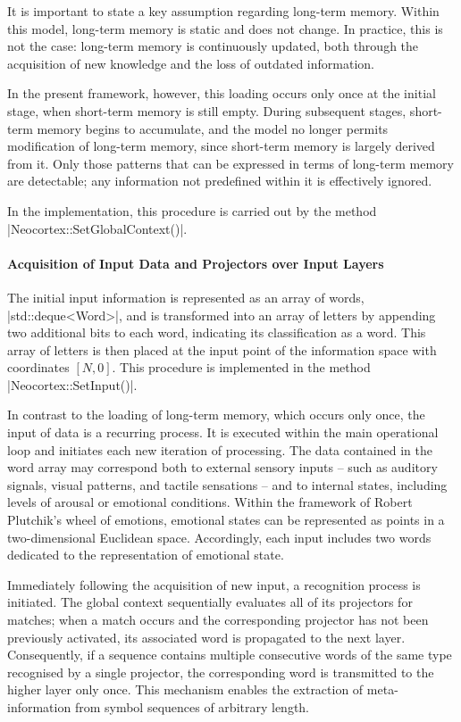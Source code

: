 \documentclass[12pt, a4paper]{article}
\begin{document}
It is important to state a key assumption regarding long-term memory. Within this 
model, long-term memory is static and does not change. In practice, this is not 
the case: long-term memory is continuously updated, both through the acquisition of new 
knowledge and the loss of outdated information.

In the present framework, however, this loading occurs only once at the initial stage, 
when short-term memory is still empty. During subsequent stages, short-term memory 
begins to accumulate, and the model no longer permits modification of long-term memory, 
since short-term memory is largely derived from it. Only those patterns that can be 
expressed in terms of long-term memory are detectable; any information not predefined 
within it is effectively ignored.

In the implementation, this procedure is carried out by the method 
|Neocortex::SetGlobalContext()|.

\paragraph{Acquisition of Input Data and Projectors over Input Layers}

The initial input information is represented as an array of words, 
|std::deque<Word>|, and is transformed into an array of letters by appending two 
additional bits to each word, indicating its classification as a word. This array of 
letters is then placed at the input point of the information space with coordinates 
$[N,0]$. This procedure is implemented in the method |Neocortex::SetInput()|.

In contrast to the loading of long-term memory, which occurs only once, the input 
of data is a recurring process. It is executed within the main operational loop 
and initiates each new iteration of processing. The data contained in the word array 
may correspond both to external sensory inputs -- such as auditory signals, visual patterns, 
and tactile sensations -- and to internal states, including levels of arousal or emotional 
conditions. Within the framework of Robert Plutchik’s wheel of 
emotions\cite{Emotion_classification}, emotional states can be represented as points in a 
two-dimensional Euclidean space. Accordingly, each input includes two words dedicated 
to the representation of emotional state.

Immediately following the acquisition of new input, a recognition process is initiated. 
The global context sequentially evaluates all of its projectors for matches; when a 
match occurs and the corresponding projector has not been previously activated, 
its associated word is propagated to the next layer. Consequently, if a sequence 
contains multiple consecutive words of the same type recognised by a single projector, 
the corresponding word is transmitted to the higher layer only once. This mechanism 
enables the extraction of meta-information from symbol sequences of arbitrary length.
\end{document}
